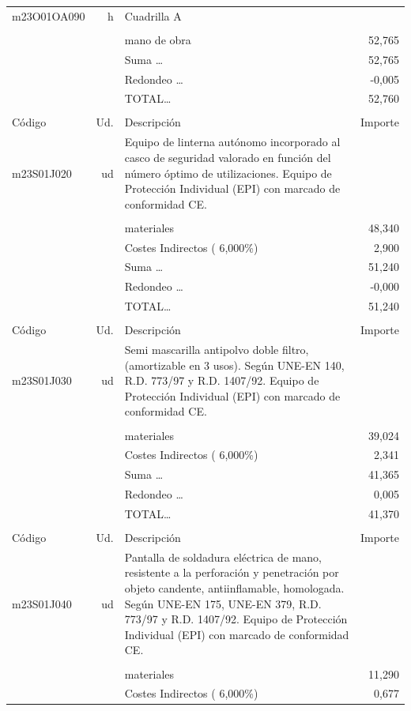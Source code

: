 \begin{supertabular}{l r p{60mm} r}
\hline%
m23O01OA090&h&Cuadrilla A&\\%
&&&\\%
&&mano de obra&    52,765\\%
&&Suma \ldots&    52,765\\%
&&Redondeo \ldots&    {-}0,005\\%
%
&&TOTAL\ldots&    52,760\\%
&&&\\%
Código&Ud.&Descripción&Importe\\%
\hline%
m23S01J020&ud&Equipo de linterna autónomo incorporado al casco de seguridad valorado en función del número óptimo de utilizaciones. Equipo de Protección Individual (EPI) con marcado de conformidad CE.&\\%
&&&\\%
&&materiales&    48,340\\%
&&Costes Indirectos (     6,000\%)&     2,900\\%
&&Suma \ldots&    51,240\\%
&&Redondeo \ldots&    {-}0,000\\%
%
&&TOTAL\ldots&    51,240\\%
&&&\\%
Código&Ud.&Descripción&Importe\\%
\hline%
m23S01J030&ud&Semi mascarilla antipolvo doble filtro, (amortizable en 3 usos). Según UNE{-}EN 140, R.D. 773/97 y R.D. 1407/92. Equipo de Protección Individual (EPI) con marcado de conformidad CE.&\\%
&&&\\%
&&materiales&    39,024\\%
&&Costes Indirectos (     6,000\%)&     2,341\\%
&&Suma \ldots&    41,365\\%
&&Redondeo \ldots&     0,005\\%
%
&&TOTAL\ldots&    41,370\\%
&&&\\%
Código&Ud.&Descripción&Importe\\%
\hline%
m23S01J040&ud&Pantalla de soldadura eléctrica de mano, resistente a la perforación y penetración por objeto candente, antiinflamable, homologada. Según UNE{-}EN 175, UNE{-}EN 379, R.D. 773/97 y R.D. 1407/92. Equipo de Protección Individual (EPI) con marcado de conformidad CE.&\\%
&&&\\%
&&materiales&    11,290\\%
&&Costes Indirectos (     6,000\%)&     0,677\\%

\end{supertabular}
